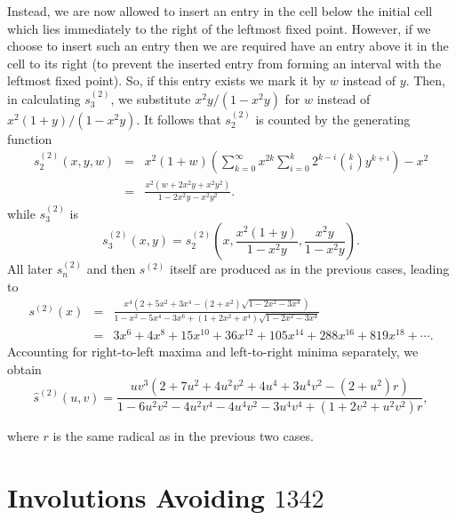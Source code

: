 \documentclass[10pt]{article}
\theoremstyle{plain}
\newcommand{\pa}[1]{\left({#1}\right)}
\begin{document}
Instead, we are now allowed to insert an entry in the cell below the initial cell which lies immediately to the right of the leftmost fixed point. However, if we choose to insert such an entry then we are required have an entry above it in the cell to its right (to prevent the inserted entry from forming an interval with the leftmost fixed point). So, if this entry exists we mark it by $w$ instead of $y$. Then, in calculating $s^{(2)}_3$, we substitute $x^2y/(1-x^2y)$ for $w$ instead of $x^2(1+y)/(1-x^2y)$. It follows that $s^{(2)}_2$ is counted by the generating function
	\begin{eqnarray*}
	s^{(2)}_2(x,y,w)
	&=&
	x^2(1+w)\left(\sum_{k=0}^\infty x^{2k}\sum_{i=0}^k 2^{k-i}{k\choose i}y^{k+i}\right)-x^2\\
	&=&
	\frac{x^2(w+2x^2y+x^2y^2)}{1-2x^2y-x^2y^2}.
	\end{eqnarray*}
while $s^{(2)}_3$ is
	\[
	s_3^{(2)}(x,y)=s_2^{(2)}\left(x, \frac{x^2(1+y)}{1-x^2y}, \frac{x^2y}{1-x^2y}\right).
	\]
All later $s_n^{(2)}$ and then $s^{(2)}$ itself are produced as in the previous cases, leading to
	\begin{eqnarray*}
	s^{(2)}(x)
	&=&
	\frac{x^4(2+5x^2+3x^4-(2+x^2)\sqrt{1-2x^2-3x^4})}
	{1-x^2-5x^4-3x^6+(1+2x^2+x^4)\sqrt{1-2x^2-3x^4}}\\
	&=&
	3x^6+4x^8+15x^{10}+36x^{12}+105x^{14}+288x^{16}+819x^{18}+\cdots.
	\end{eqnarray*}
Accounting for right-to-left maxima and left-to-right minima separately, we obtain
	\[
	\widehat{s}^{(2)}(u,v)
	=
	\frac{uv^3\pa{2+7u^2+4u^2v^2+4u^4+3u^4v^2-(2+u^2)r}}
	{1-6u^2v^2-4u^2v^4-4u^4v^2-3u^4v^4+(1+2v^2+u^2v^2)r},
	\]
	

where $r$ is the same radical as in the previous two cases.

%
%
%
%
%
%

\section{Involutions Avoiding $1342$}
\label{sec-1342}
\end{document}
